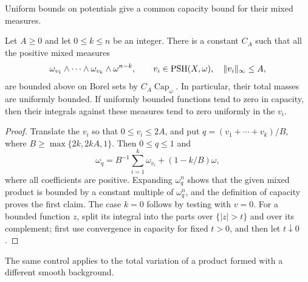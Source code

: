 Uniform bounds on potentials give a common capacity bound for their mixed measures.

\begin{lemma}\label{lem:bounded-mixed-capacity}
Let $A\geq0$ and let $0\leq k\leq n$ be an integer. There is a constant $C_A$ such that all the positive mixed measures
\[
 \omega_{v_1}\wedge\cdots\wedge\omega_{v_k}\wedge\omega^{n-k},
 \qquad v_i\in\mathrm{PSH}(X,\omega),
 \quad \|v_i\|_\infty\leq A,
\]
are bounded above on Borel sets by $C_A\operatorname{Cap}_\omega$. In particular, their total masses are uniformly bounded. If uniformly bounded functions tend to zero in capacity, then their integrals against these measures tend to zero uniformly in the $v_i$.
\end{lemma}
\begin{proof}
Translate the $v_i$ so that $0\leq v_i\leq2A$, and put
$q=(v_1+\cdots+v_k)/B$, where $B\geq\max\{2k,2kA,1\}$.
Then $0\leq q\leq1$ and
\[
 \omega_q=B^{-1}\sum_{i=1}^k\omega_{v_i}+(1-k/B)\omega,
\]
where all coefficients are positive. Expanding $\omega_q^n$ shows that the given mixed product is bounded by a constant multiple of $\omega_q^n$, and the definition of capacity proves the first claim. The case $k=0$ follows by testing with $v=0$. For a bounded function $z$, split its integral into the parts over $\{|z|>t\}$ and over its complement; first use convergence in capacity for fixed $t>0$, and then let $t\downarrow0$.
\end{proof}

The same control applies to the total variation of a product formed with a different smooth background.

